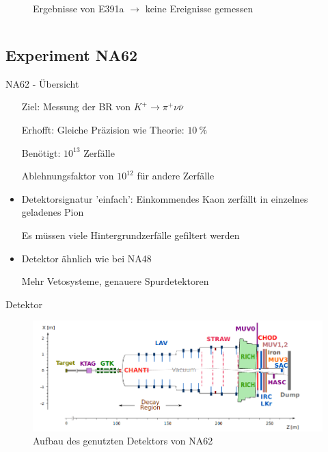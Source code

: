 \documentclass[aspectratio=1610, professionalfonts, 9pt, t]{beamer}
\begin{document}
\begin{frame}
\begin{columns}[onlytextwidth]
\begin{column}{0.5\textwidth}
\begin{figure}[ht]
\begin{center}
            \caption{Ergebnisse von E391a $\rightarrow$ keine Ereignisse gemessen}
          \end{center}
        \end{figure}
      \end{column}
    \end{columns}
\end{frame}


  \subsection{Experiment NA62}

  \begin{frame}{NA62 - Übersicht}
    \begin{itemize}
      \setlength{\itemindent}{0.5cm}
      \item[Ziel:] Messung der BR von $K^+ \rightarrow \pi^+ \nu \bar{\nu}$
      \item[Erhofft:] Gleiche Präzision wie Theorie: $\SI{10}{\percent}$
      \item[Benötigt:] $10^{13}$ Zerfälle
    \end{itemize}
    \begin{itemize}
      \item[\rightarrow] Ablehnungsfaktor von $10^{12}$ für andere Zerfälle
      \item Detektorsignatur 'einfach': Einkommendes Kaon zerfällt in einzelnes geladenes Pion
      \item[\rightarrow] Es müssen viele Hintergrundzerfälle gefiltert werden
      \item Detektor ähnlich wie bei NA48
      \item[\rightarrow] Mehr Vetosysteme, genauere Spurdetektoren
    \end{itemize}
  \end{frame}

  \begin{frame}{Detektor}
    \begin{figure}[ht]
      \includegraphics[height=0.75\textheight]{Images/na62detektor.png}
      \caption{Aufbau des genutzten Detektors von NA62}%
    \end{figure}
  \end{frame}
\end{document}
